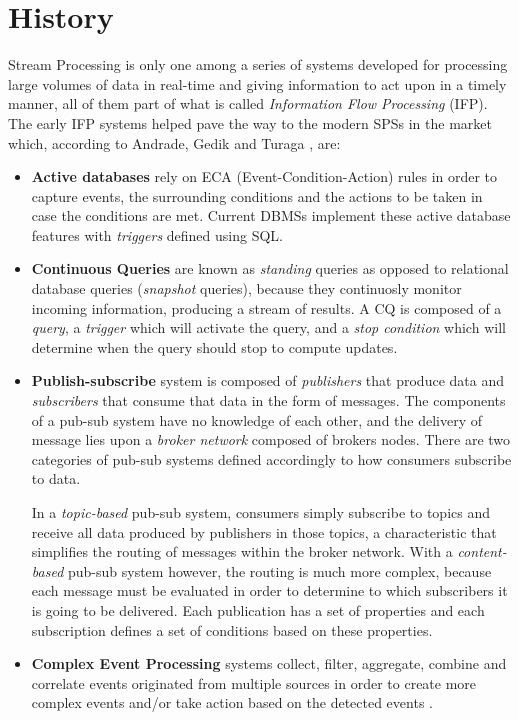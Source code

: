 \documentclass[ppgc,diss,english]{iiufrgs}
\begin{document}
\section{History}
\label{sec:esp:history}

Stream Processing is only one among a series of systems developed for processing large volumes of data in real-time and giving information to act upon in a timely manner, all of them part of what is called \emph{Information Flow Processing} (IFP). The early IFP systems helped pave the way to the modern SPSs in the market which, according to Andrade, Gedik and Turaga \cite{andrade2014fundamentals}, are: 


\begin{itemize}
\item \textbf{Active databases} rely on ECA (Event-Condition-Action) rules in order to capture events, the surrounding conditions and the actions to be taken in case the conditions are met. Current DBMSs implement these active database features with \emph{triggers} defined using SQL.

\item \textbf{Continuous Queries} are known as \emph{standing} queries as opposed to relational database queries (\emph{snapshot} queries), because they continuosly monitor incoming information, producing a stream of results. A CQ is composed of a \emph{query}, a \emph{trigger} which will activate the query, and a \emph{stop condition} which will determine when the query should stop to compute updates.

\item \textbf{Publish-subscribe} system is composed of \emph{publishers} that produce data and \emph{subscribers} that consume that data in the form of messages. The components of a pub-sub system have no knowledge of each other, and the delivery of message lies upon a \emph{broker network} composed of brokers nodes. There are two categories of pub-sub systems defined accordingly to how consumers subscribe to data.

In a \emph{topic-based} pub-sub system, consumers simply subscribe to topics and receive all data produced by publishers in those topics, a characteristic that simplifies the routing of messages within the broker network. With a \emph{content-based} pub-sub system however, the routing is much more complex, because each message must be evaluated in order to determine to which subscribers it is going to be delivered. Each publication has a set of properties and each subscription defines a set of conditions based on these properties.

\item \textbf{Complex Event Processing} systems collect, filter, aggregate, combine and correlate events originated from multiple sources in order to create more complex events and/or take action based on the detected events \cite{robins2010complex}.
\end{itemize}
\end{document}
